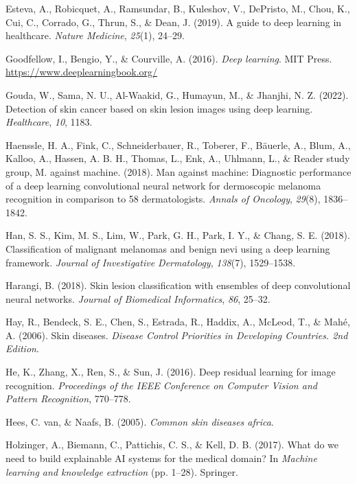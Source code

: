 \documentclass[
  12pt,
  oneside]{article}
\newlength{\cslhangindent}
\newenvironment{CSLReferences}[2] %
 {\begin{list}{}{%
  \setlength{\itemindent}{0pt}
  \setlength{\leftmargin}{0pt}
  \setlength{\parsep}{0pt}
  \ifodd #1
   \setlength{\leftmargin}{\cslhangindent}
   \setlength{\itemindent}{-1\cslhangindent}
  \fi
  \setlength{\itemsep}{#2\baselineskip}}}
 {\end{list}}
\begin{document}
\begin{CSLReferences}{1}{0}
Esteva, A., Robicquet, A., Ramsundar, B., Kuleshov, V., DePristo, M.,
Chou, K., Cui, C., Corrado, G., Thrun, S., \& Dean, J. (2019). A guide
to deep learning in healthcare. \emph{Nature Medicine}, \emph{25}(1),
24--29.

Goodfellow, I., Bengio, Y., \& Courville, A. (2016). \emph{Deep
learning}. MIT Press. \url{https://www.deeplearningbook.org/}

Gouda, W., Sama, N. U., Al-Waakid, G., Humayun, M., \& Jhanjhi, N. Z.
(2022). Detection of skin cancer based on skin lesion images using deep
learning. \emph{Healthcare}, \emph{10}, 1183.

Haenssle, H. A., Fink, C., Schneiderbauer, R., Toberer, F., Bäuerle, A.,
Blum, A., Kalloo, A., Hassen, A. B. H., Thomas, L., Enk, A., Uhlmann,
L., \& Reader study group, M. against machine. (2018). Man against
machine: Diagnostic performance of a deep learning convolutional neural
network for dermoscopic melanoma recognition in comparison to 58
dermatologists. \emph{Annals of Oncology}, \emph{29}(8), 1836--1842.

Han, S. S., Kim, M. S., Lim, W., Park, G. H., Park, I. Y., \& Chang, S.
E. (2018). Classification of malignant melanomas and benign nevi using a
deep learning framework. \emph{Journal of Investigative Dermatology},
\emph{138}(7), 1529--1538.

Harangi, B. (2018). Skin lesion classification with ensembles of deep
convolutional neural networks. \emph{Journal of Biomedical Informatics},
\emph{86}, 25--32.

Hay, R., Bendeck, S. E., Chen, S., Estrada, R., Haddix, A., McLeod, T.,
\& Mahé, A. (2006). Skin diseases. \emph{Disease Control Priorities in
Developing Countries. 2nd Edition}.

He, K., Zhang, X., Ren, S., \& Sun, J. (2016). Deep residual learning
for image recognition. \emph{Proceedings of the IEEE Conference on
Computer Vision and Pattern Recognition}, 770--778.

Hees, C. van, \& Naafs, B. (2005). \emph{Common skin diseases africa}.

Holzinger, A., Biemann, C., Pattichis, C. S., \& Kell, D. B. (2017).
What do we need to build explainable AI systems for the medical domain?
In \emph{Machine learning and knowledge extraction} (pp. 1--28).
Springer.


\end{CSLReferences}
\end{document}
